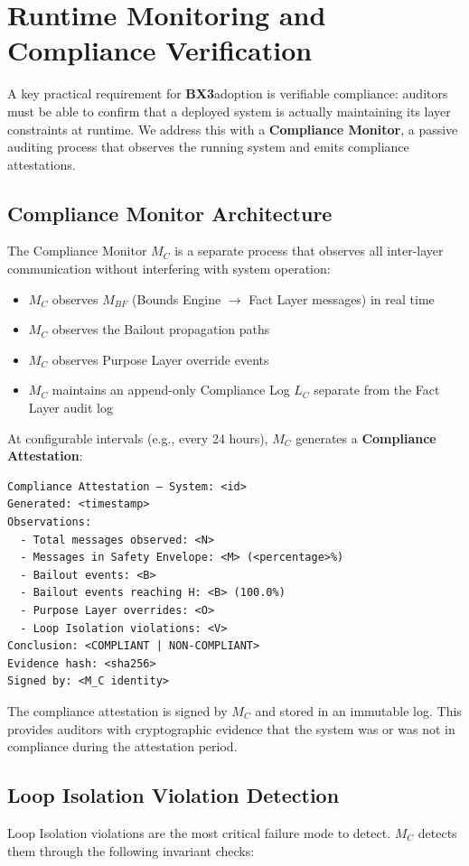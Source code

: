 \documentclass[12pt]{article}
\newcommand{\bxthree}{\textbf{BX3}}
\begin{document}
\section{Runtime Monitoring and Compliance Verification}
\label{sec:monitoring}

A key practical requirement for \bxthree adoption is verifiable compliance: auditors must be able to confirm that a deployed system is actually maintaining its layer constraints at runtime. We address this with a \textbf{Compliance Monitor}, a passive auditing process that observes the running system and emits compliance attestations.

\subsection{Compliance Monitor Architecture}
The Compliance Monitor $M_C$ is a separate process that observes all inter-layer communication without interfering with system operation:

\begin{itemize}
\item $M_C$ observes $M_{BF}$ (Bounds Engine $\rightarrow$ Fact Layer messages) in real time
\item $M_C$ observes the Bailout propagation paths
\item $M_C$ observes Purpose Layer override events
\item $M_C$ maintains an append-only Compliance Log $L_C$ separate from the Fact Layer audit log
\end{itemize}

At configurable intervals (e.g., every 24 hours), $M_C$ generates a \textbf{Compliance Attestation}:

\begin{verbatim}
Compliance Attestation — System: <id>
Generated: <timestamp>
Observations:
  - Total messages observed: <N>
  - Messages in Safety Envelope: <M> (<percentage>%)
  - Bailout events: <B>
  - Bailout events reaching H: <B> (100.0%)
  - Purpose Layer overrides: <O>
  - Loop Isolation violations: <V>
Conclusion: <COMPLIANT | NON-COMPLIANT>
Evidence hash: <sha256>
Signed by: <M_C identity>
\end{verbatim}

The compliance attestation is signed by $M_C$ and stored in an immutable log. This provides auditors with cryptographic evidence that the system was or was not in compliance during the attestation period.

\subsection{Loop Isolation Violation Detection}
Loop Isolation violations are the most critical failure mode to detect. $M_C$ detects them through the following invariant checks:
\end{document}

